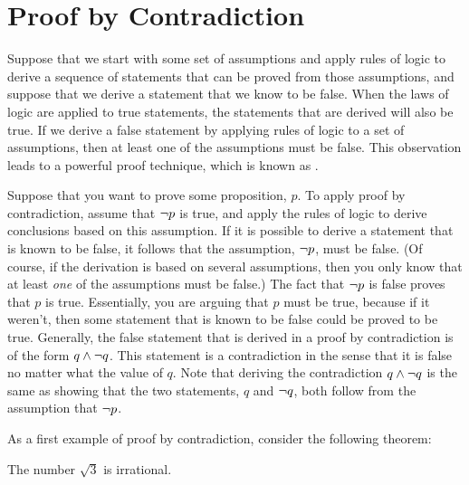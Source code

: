 \section{Proof by Contradiction}

Suppose that we start with some set of assumptions and apply rules
of logic to derive a sequence of statements that can be proved from
those assumptions, and suppose that we derive a statement that we
know to be false.  When the laws of logic are applied to true
statements, the statements that are derived will also be true.
If we derive a false statement by applying rules of logic to a set
of assumptions, then at least one of the assumptions must be false.
This observation leads to a powerful proof technique, which
is known as .

Suppose that you want to prove some proposition, $p$.
To apply proof by contradiction, assume that $\lnot p$ is true,
and apply the rules of logic to derive conclusions based on this
assumption.  If it is possible to derive a statement that is known
to be false, it follows that the assumption, $\lnot p$, must be false.
(Of course, if the derivation is based on several assumptions, then you only
know that at least \emph{one} of the assumptions must be false.)
The fact that $\lnot p$ is false proves that $p$ is true.
Essentially, you are arguing that $p$ must be true, because if it 
weren't, then some statement that is known to be false could be proved to be true.
Generally, the false statement that is derived in a proof by
contradiction is of the form $q\wedge \lnot q$.  This statement
is a contradiction in the sense that it is false no matter what
the value of $q$.  Note that deriving the contradiction $q\wedge \lnot q$
is the same as showing that the two statements, $q$ and $\lnot q$, both
follow from the assumption that $\lnot p$.

As a first example of proof by contradiction, consider the
following theorem:

\begin{theorem}
The number $\sqrt{3}$ is irrational.
\end{theorem}


